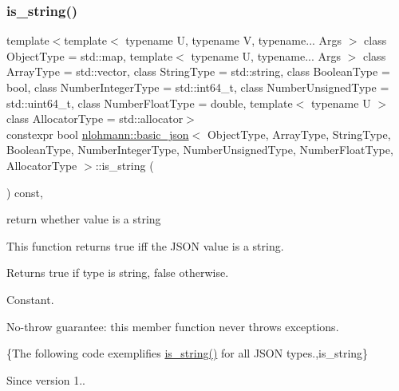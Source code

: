 \subsubsection{\texorpdfstring{is\+\_\+string()}{is\_string()}}
{\footnotesize\ttfamily template$<$template$<$ typename U, typename V, typename... Args $>$ class Object\+Type = std\+::map, template$<$ typename U, typename... Args $>$ class Array\+Type = std\+::vector, class String\+Type  = std\+::string, class Boolean\+Type  = bool, class Number\+Integer\+Type  = std\+::int64\+\_\+t, class Number\+Unsigned\+Type  = std\+::uint64\+\_\+t, class Number\+Float\+Type  = double, template$<$ typename U $>$ class Allocator\+Type = std\+::allocator$>$ \\
constexpr bool \hyperlink{classnlohmann_1_1basic__json}{nlohmann\+::basic\+\_\+json}$<$ Object\+Type, Array\+Type, String\+Type, Boolean\+Type, Number\+Integer\+Type, Number\+Unsigned\+Type, Number\+Float\+Type, Allocator\+Type $>$\+::is\+\_\+string (\begin{DoxyParamCaption}{ }\end{DoxyParamCaption}) const\hspace{0.3cm}{\ttfamily [inline]}, {\ttfamily [noexcept]}}



return whether value is a string 

This function returns true iff the J\+S\+ON value is a string.

\begin{DoxyReturn}{Returns}
{\ttfamily true} if type is string, {\ttfamily false} otherwise.
\end{DoxyReturn}
Constant.

No-\/throw guarantee\+: this member function never throws exceptions.

\{The following code exemplifies {\ttfamily \hyperlink{classnlohmann_1_1basic__json_a409e854d754f5684b2cce74ee20dbc3b}{is\+\_\+string()}} for all J\+S\+ON types.,is\+\_\+string\}

\begin{DoxySince}{Since}
version 1.. 
\end{DoxySince}
\hypertarget{classnlohmann_1_1basic__json_a873f4bff2f2a83f68fc1b5341ebdd446}{}\label{classnlohmann_1_1basic__json_a873f4bff2f2a83f68fc1b5341ebdd446} 
